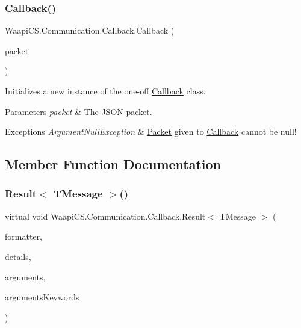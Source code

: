\subsubsection{\texorpdfstring{Callback()}{Callback()}}
{\footnotesize\ttfamily Waapi\+C\+S.\+Communication.\+Callback.\+Callback (\begin{DoxyParamCaption}\item[{\mbox{\hyperlink{class_waapi_c_s_1_1_communication_1_1_packet}{Packet}}}]{packet }\end{DoxyParamCaption})}



Initializes a new instance of the one-\/off \mbox{\hyperlink{class_waapi_c_s_1_1_communication_1_1_callback}{Callback}} class. 


\begin{DoxyParams}{Parameters}
{\em packet} & The J\+S\+ON packet.\\
\hline
\end{DoxyParams}

\begin{DoxyExceptions}{Exceptions}
{\em Argument\+Null\+Exception} & \mbox{\hyperlink{class_waapi_c_s_1_1_communication_1_1_packet}{Packet}} given to \mbox{\hyperlink{class_waapi_c_s_1_1_communication_1_1_callback}{Callback}} cannot be null!\\
\hline
\end{DoxyExceptions}


\subsection{Member Function Documentation}
\mbox{\label{class_waapi_c_s_1_1_communication_1_1_callback_a5730b33a0a1c0c0b169ad231cf8257ce}} 
\subsubsection{\texorpdfstring{Result$<$ T\+Message $>$()}{Result< TMessage >()}}
{\footnotesize\ttfamily virtual void Waapi\+C\+S.\+Communication.\+Callback.\+Result$<$ T\+Message $>$ (\begin{DoxyParamCaption}\item[{I\+Wamp\+Formatter$<$ T\+Message $>$}]{formatter,  }\item[{Result\+Details}]{details,  }\item[{T\+Message \mbox{[}$\,$\mbox{]}}]{arguments,  }\item[{I\+Dictionary$<$ string, T\+Message $>$}]{arguments\+Keywords }\end{DoxyParamCaption})\hspace{0.3cm}{\ttfamily [virtual]}}



